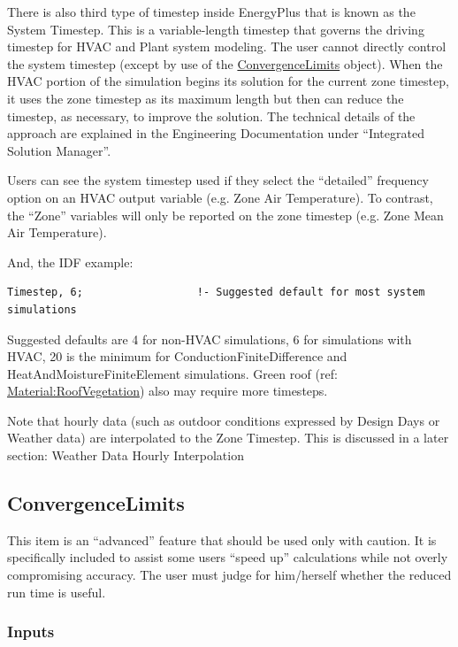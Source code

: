 There is also third type of timestep inside EnergyPlus that is known as the System Timestep. This is a variable-length timestep that governs the driving timestep for HVAC and Plant system modeling. The user cannot directly control the system timestep (except by use of the \hyperref[convergencelimits]{ConvergenceLimits} object). When the HVAC portion of the simulation begins its solution for the current zone timestep, it uses the zone timestep as its maximum length but then can reduce the timestep, as necessary, to improve the solution. The technical details of the approach are explained in the Engineering Documentation under ``Integrated Solution Manager''.

Users can see the system timestep used if they select the ``detailed'' frequency option on an HVAC output variable (e.g. Zone Air Temperature). To contrast, the ``Zone'' variables will only be reported on the zone timestep (e.g. Zone Mean Air Temperature).

And, the IDF example:

\begin{lstlisting}
Timestep, 6;                  !- Suggested default for most system simulations
\end{lstlisting}

Suggested defaults are 4 for non-HVAC simulations, 6 for simulations with HVAC, 20 is the minimum for ConductionFiniteDifference and HeatAndMoistureFiniteElement simulations. Green roof (ref: \hyperref[materialroofvegetation]{Material:RoofVegetation}) also may require more timesteps.

Note that hourly data (such as outdoor conditions expressed by Design Days or Weather data) are interpolated to the Zone Timestep. This is discussed in a later section: Weather Data Hourly Interpolation

\subsection{ConvergenceLimits}\label{convergencelimits}

This item is an ``advanced'' feature that should be used only with caution. It is specifically included to assist some users ``speed up'' calculations while not overly compromising accuracy. The user must judge for him/herself whether the reduced run time is useful.

\subsubsection{Inputs}\label{inputs-2-038}

